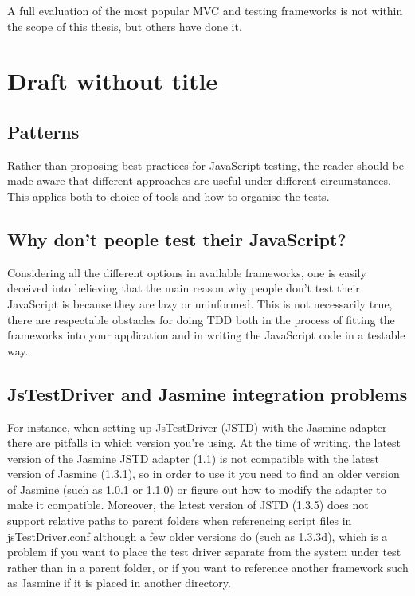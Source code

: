 \documentclass[11pt]{article}
\begin{document}
A full evaluation of the most popular MVC and testing frameworks is not within the scope of this thesis, but others have done it. \cite{JackFranklin, SebastianPorto}

\section{Draft without title}

\subsection{Patterns}

Rather than proposing best practices for JavaScript testing, the reader should be made aware that different approaches are useful under different circumstances. This applies both to choice of tools and how to organise the tests.

\subsection{Why don't people test their JavaScript?}

Considering all the different options in available frameworks, one is easily deceived into believing that the main reason why people don't test their JavaScript is because they are lazy or uninformed. This is not necessarily true, there are respectable obstacles for doing TDD both in the process of fitting the frameworks into your application and in writing the JavaScript code in a testable way.

\subsection{JsTestDriver and Jasmine integration problems}

For instance, when setting up JsTestDriver (JSTD)\cite{JsTestDriver} with the Jasmine adapter there are pitfalls in which version you're using. At the time of writing, the latest version of the Jasmine JSTD adapter (1.1) is not compatible with the latest version of Jasmine (1.3.1), so in order to use it you need to find an older version of Jasmine (such as 1.0.1 or 1.1.0) or figure out how to modify the adapter to make it compatible. Moreover, the latest version of JSTD (1.3.5) does not support relative paths to parent folders when referencing script files in jsTestDriver.conf although a few older versions do (such as 1.3.3d), which is a problem if you want to place the test driver separate from the system under test rather than in a parent folder, or if you want to reference another framework such as Jasmine if it is placed in another directory.
\end{document}

